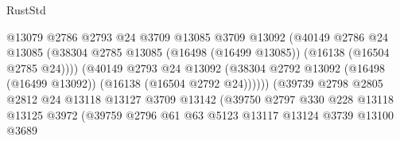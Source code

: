 \begin{lexlean}{RustStd}
\begin{coremodule}
                                          @13079
                                          @2786
                                          @2793
                                          @24
                                          @3709
                                          @13085
                                          @3709
                                          @13092
                                          (@40149
                                            @2786
                                            @24
                                            @13085
                                            (@38304
                                              @2785
                                              @13085
                                              (@16498 (@16499 @13085))
                                              (@16138 (@16504 @2785 @24))))
                                          (@40149
                                            @2793
                                            @24
                                            @13092
                                            (@38304
                                              @2792
                                              @13092
                                              (@16498 (@16499 @13092))
                                              (@16138 (@16504 @2792 @24))))))
                                      (@39739
                                        @2798
                                        @2805
                                        @2812
                                        @24
                                        @13118
                                        @13127
                                        @3709
                                        @13142
                                        (@39750
                                          @2797
                                          @330
                                          @228
                                          @13118
                                          @13125
                                          @3972
                                          (@39759
                                            @2796
                                            @61
                                            @63
                                            @5123
                                            @13117
                                            @13124
                                            @3739
                                            @13100
                                            @3689

\end{coremodule}
\end{lexlean}
